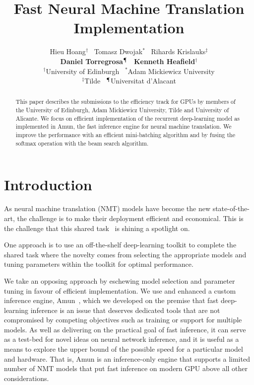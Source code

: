 \documentclass[11pt,a4paper]{article}
\title{Fast Neural Machine Translation Implementation}
\author{Hieu Hoang$^{\dagger}$ \, Tomasz Dwojak$^{*}$ \, Rihards Krislauks$^{\ddagger}$ \\ {\bf Daniel Torregrosa$^{\mathparagraph}$ \, Kenneth Heafield$^{\dagger}$ } \\[2mm]
  $^{\dagger}$University of Edinburgh \, $^{*}$Adam Mickiewicz University \\ $^{\ddagger}$Tilde \,  $^{\mathparagraph}$Universitat d'Alacant }
\date{}
\begin{document}
\maketitle
\begin{abstract}

This paper describes the submissions to the efficiency track for GPUs by members of the University of Edinburgh, Adam Mickiewicz University, Tilde and University of Alicante. We focus on efficient implementation of the recurrent deep-learning model as implemented in Amun, the fast inference engine for neural machine translation. We improve the performance with an efficient mini-batching algorithm and by fusing the softmax operation with the beam search algorithm.


\end{abstract}

\section{Introduction}
\label{sec:Introduction}

As neural machine translation (NMT) models have become the new state-of-the-art, the challenge is to make their deployment efficient and economical. This is the challenge that this shared task~\citep{birch2018wnmt} is shining a spotlight on.

One approach is to use an off-the-shelf deep-learning toolkit to complete the shared task where the novelty comes from selecting the appropriate models and tuning parameters within the toolkit for optimal performance. %

We take an opposing approach by eschewing model selection and parameter tuning in favour of efficient implementation. We use and enhanced a custom inference engine, Amun~\citep{junczys2016neural}, which we developed on the premise that fast deep-learning inference is an issue that deserves dedicated tools that are not compromised by competing objectives such as training or support for multiple models. As well as delivering on the practical goal of fast inference, it can serve as a test-bed for novel ideas on neural network inference, and it is useful as a means to explore the upper bound of the possible speed for a particular model and hardware. That is, Amun is an inference-only engine that supports a limited number of NMT models that put fast inference on modern GPU above all other considerations. %
\end{document}
